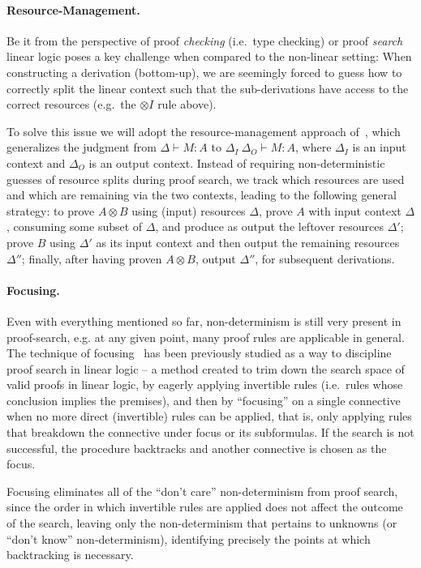 \documentclass{llncs}
\newcommand{\tensor}{\otimes}
\newcommand{\mypara}[1]{\paragraph{\textbf{#1}.}}
\begin{document}
\mypara{Resource-Management}
Be it from the perspective of proof \emph{checking} (i.e.~type checking) or
proof \emph{search} linear logic poses a key challenge when compared
to the non-linear setting:
When constructing a derivation (bottom-up), we are seemingly forced to
guess how to correctly split the linear context such that the
sub-derivations have access to the correct resources (e.g.~the
$\tensor I$ rule above).
%
%

To solve this issue we will adopt the resource-management
approach
of~\cite{DBLP:journals/tcs/CervesatoHP00,DBLP:conf/lics/LiangM09},
which generalizes the judgment  from $\Delta \vdash M : A$ to
$\Delta_I \ \Delta_O \vdash M : A$, where $\Delta_I$ is an input
context and $\Delta_O$ is an output context.
Instead of requiring non-deterministic guesses of resource splits
during proof search, we track which resources are used and which are
remaining via the two contexts, leading to the following general strategy: to
prove $A\tensor B$ using (input) resources $\Delta$, prove $A$ with
input context $\Delta$,
consuming some subset of $\Delta$, and produce as output the leftover
resources $\Delta'$; prove $B$ using $\Delta'$ as its input context and then output the
remaining resources $\Delta''$; finally, after having proven
$A\tensor B$, output $\Delta''$, for subsequent derivations.


\mypara{Focusing}

Even with everything mentioned so far, non-determinism is still very
present in proof-search, e.g. at any given point, many proof
rules are applicable in general. The technique of focusing~\cite{10.1093/logcom/2.3.297,DBLP:conf/cade/ChaudhuriP05}
has been previously studied as a way to discipline proof search in
linear logic -- a method created to trim down the search space of
valid proofs in linear logic, by eagerly applying invertible rules
(i.e.~rules whose conclusion implies the premises), and then by
``focusing'' on a single connective when no more direct (invertible)
rules can be applied, that is, only applying rules that breakdown
the connective under focus or its subformulas. If the search is not
successful, the procedure backtracks and another connective is
chosen as the focus.

Focusing eliminates all of the ``don't care'' non-determinism from
proof search, since the order in which invertible rules are applied
does not affect the outcome of the search, leaving only the
non-determinism that pertains to unknowns (or ``don't know''
non-determinism), identifying precisely the points at which
backtracking is necessary.
\end{document}
